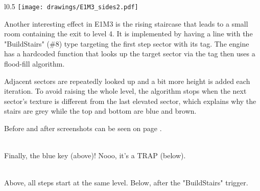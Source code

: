 \par
\begin{wrapfigure}[23]{l}{0.5\textwidth}
\centering
\texttt{[image: drawings/E1M3\_sides2.pdf]}
\end{wrapfigure}
Another interesting effect in E1M3 is the rising staircase that leads to a small room containing the exit to level 4. It is implemented by having a line with the "BuildStairs" (\#8) type targeting the first step sector with its tag. The engine has a hardcoded  function that looks up the target sector via the tag then uses a flood-fill algorithm.\\
\par Adjacent sectors are repeatedly looked up and a bit more height is added each iteration. To avoid raising the whole level, the algorithm stops when the next sector's texture is different from the last elevated sector, which explains why the stairs are grey while the top and bottom are blue and brown.\\
\par
Before and after screenshots can be seen on page \pageref{stairs}.


 \label{e1m3_trap} \\
Finally, the blue key (above)! Nooo, it's a TRAP (below).

\vspace{2mm}
 \label{stairs} \\
Above, all steps start at the same level. Below, after the "BuildStairs" trigger. 

\vspace{2mm}



